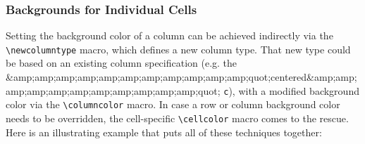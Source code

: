 \subsubsection{Backgrounds for Individual Cells}

Setting the background color of a column can be achieved indirectly via the \verb|\newcolumntype| macro, which defines a new column type. That new type could be based on an existing column specification (e.g. the &amp;amp;amp;amp;amp;amp;amp;amp;amp;amp;amp;quot;centered&amp;amp;amp;amp;amp;amp;amp;amp;amp;amp;amp;quot; \verb|c|), with a modified background color via the \verb|\columncolor| macro. In case a row or column background color needs to be overridden, the cell-specific \verb|\cellcolor| macro comes to the rescue. Here is an illustrating example that puts all of these techniques together:

